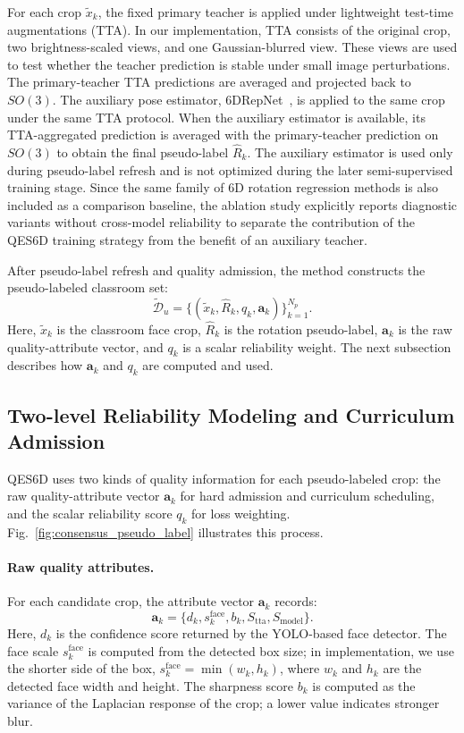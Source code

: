 \documentclass[preprint,12pt]{elsarticle}
\begin{document}
For each crop $\tilde{x}_k$, the fixed primary teacher is applied under lightweight test-time augmentations (TTA). In our implementation, TTA consists of the original crop, two brightness-scaled views, and one Gaussian-blurred view. These views are used to test whether the teacher prediction is stable under small image perturbations. The primary-teacher TTA predictions are averaged and projected back to $SO(3)$. The auxiliary pose estimator, 6DRepNet~\cite{hempel2022sixdrepnet}, is applied to the same crop under the same TTA protocol. When the auxiliary estimator is available, its TTA-aggregated prediction is averaged with the primary-teacher prediction on $SO(3)$ to obtain the final pseudo-label $\hat{R}_k$. The auxiliary estimator is used only during pseudo-label refresh and is not optimized during the later semi-supervised training stage. Since the same family of 6D rotation regression methods is also included as a comparison baseline, the ablation study explicitly reports diagnostic variants without cross-model reliability to separate the contribution of the QES6D training strategy from the benefit of an auxiliary teacher.

After pseudo-label refresh and quality admission, the method constructs the pseudo-labeled classroom set:
\begin{equation}
\tilde{\mathcal{D}}_u
=
\{(\tilde{x}_k,\hat{R}_k,q_k,\mathbf{a}_k)\}_{k=1}^{N_p}.
\label{eq:pseudo_dataset}
\end{equation}
Here, $\tilde{x}_k$ is the classroom face crop, $\hat{R}_k$ is the rotation pseudo-label, $\mathbf{a}_k$ is the raw quality-attribute vector, and $q_k$ is a scalar reliability weight. The next subsection describes how $\mathbf{a}_k$ and $q_k$ are computed and used.

\subsection{Two-level Reliability Modeling and Curriculum Admission}
\label{sec:reliability_curriculum}

QES6D uses two kinds of quality information for each pseudo-labeled crop: the raw quality-attribute vector $\mathbf{a}_k$ for hard admission and curriculum scheduling, and the scalar reliability score $q_k$ for loss weighting. Fig.~\ref{fig:consensus_pseudo_label} illustrates this process.

\paragraph{Raw quality attributes.}
For each candidate crop, the attribute vector $\mathbf{a}_k$ records:
\[
\mathbf{a}_k =
\{d_k, s_k^{\mathrm{face}}, b_k, S_{\mathrm{tta}}, S_{\mathrm{model}}\}.
\]
Here, $d_k$ is the confidence score returned by the YOLO-based face detector. The face scale $s_k^{\mathrm{face}}$ is computed from the detected box size; in implementation, we use the shorter side of the box, $s_k^{\mathrm{face}}=\min(w_k,h_k)$, where $w_k$ and $h_k$ are the detected face width and height. The sharpness score $b_k$ is computed as the variance of the Laplacian response of the crop; a lower value indicates stronger blur.
\end{document}
